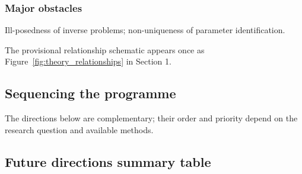 \subsubsection{Major obstacles}

Ill-posedness of inverse problems; non-uniqueness of parameter identification.

The provisional relationship schematic appears once as Figure~\ref{fig:theory_relationships} in Section 1.

\subsection{Sequencing the programme}
\label{sec:programme-sequencing}

The directions below are complementary; their order and priority depend on the research question and available methods.

\subsection{Future directions summary table}
\label{sec:future-summary}

